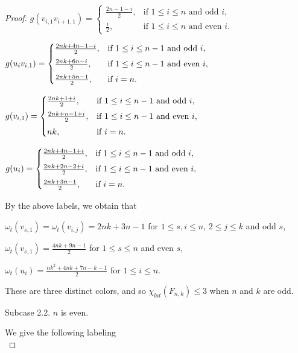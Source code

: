 \documentclass[10pt,a4paper]{amsart}
\begin{document}
\begin{proof}
$g(v_{i,1}v_{i+1,1})=\begin{cases}
\frac{2n-1-i}{2}, & \text{if $1\leq i\leq n$ and odd $i$},\\[4pt]
\frac{i}{2}, & \text{if $1\leq i\leq n$ and even $i$}. \end{cases}$\vspace{0.5em}

$g(u_{i}v_{i,1})=\begin{cases}
\frac{2nk+4n-1-i}{2}, & \text{if $1\leq i\leq n-1$ and odd $i$},\\[4pt]
\frac{2nk+6n-i}{2}, & \text{if $1\leq i\leq n-1$ and even $i$},\\[4pt]
\frac{2nk+5n-1}{2}, & \text{if $ i= n$}.\end{cases}$\vspace{0.5em}

$g(v_{i,1})=\begin{cases}
\frac{2nk+1+i}{2}, & \text{if $1\leq i\leq n-1$ and odd $i$},\\[4pt]
\frac{2nk+n-1+i}{2}, & \text{if $1\leq i\leq n-1$ and even $i$},\\[4pt]
nk, & \text{if $ i= n$}.\end{cases}$\vspace{0.5em}

$g(u_{i})=\begin{cases}
\frac{2nk+4n-1+i}{2}, & \text{if $1\leq i\leq n-1$ and odd $i$},\\[4pt]
\frac{2nk+2n-2+i}{2}, & \text{if $1\leq i\leq n-1$ and even $i$},\\[4pt]
\frac{2nk+3n-1}{2}, & \text{if $ i= n$}.\end{cases}$\vspace{0.6em}

\noindent By the above labels, we obtain that

$\omega_{t}(v_{s,1})=\omega_{t}(v_{i,j})=2nk+3n-1$ for $1\leq s,i\leq n$, $2\leq j\leq k$ and odd $s$,

$\omega_{t}(v_{s,1})=\frac{4nk+9n-1}{2}$ for $1\leq s\leq n$ and even $s$,

$\omega_{t}(u_{i})=\frac{nk^{2}+4nk+7n-k-1}{2}$ for $1\leq i\leq n$.

\noindent These are three distinct colors, and so $\chi_{lat}(F_{n,k})\leq 3$ when $n$ and $k$ are odd.

Subcase 2.2.  $n$ is even. \vspace{0.4em}

We give the following labeling\\


\end{proof}
\end{document}
